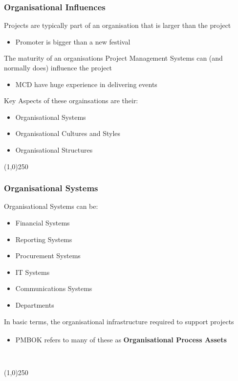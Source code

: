 \begin{frame}
\frametitle{Organisational Influences}
Projects are typically part of an organisation that is larger than the project\\
\begin{itemize}
	\item Promoter is bigger than a new festival
\end{itemize}
The maturity of an organisations Project Management Systems can (and normally does) influence the project\\
\begin{itemize}
	\item MCD have huge experience in delivering events
\end{itemize}
Key Aspects of these orgainsations are their:\\
	\begin{itemize}
		\item Organisational Systems
		\item Organisational Cultures and Styles
		\item Organisational Structures
	\end{itemize}
\end{frame}
\begin{center}\line(1,0){250}\end{center}



\begin{frame}
\frametitle{Organisational Systems}
Organisational Systems can be:\\
\begin{itemize}
\item Financial Systems
\item Reporting Systems
\item Procurement Systems
\item IT Systems
\item Communications Systems
\item Departments
\end{itemize}
In basic terms, the organisational infrastructure required to support projects\\
\begin{itemize}
\item PMBOK\textsuperscript{\textregistered} refers to many of these as \textbf{Organisational Process Assets}\
\end{itemize}\
\end{frame}
\begin{center}\line(1,0){250}\end{center}




